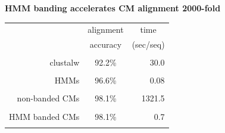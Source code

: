 \documentclass[landscape]{slides}
\begin{document}
\begin{slide}
\begin{center}

\textbf{HMM banding accelerates CM alignment 2000-fold}
\end{center}
\medskip
\medskip
\begin{center}

\begin{tabular}{rcr} 
& \multicolumn{1}{c}{alignment} & \multicolumn{1}{c}{time} \\
& \multicolumn{1}{c}{accuracy} & \multicolumn{1}{c}{(sec/seq)} \\ \hline
& \multicolumn{1}{c}{} & \multicolumn{1}{c}{} \\
clustalw & 92.2\% & 30.0 \\ 
& \multicolumn{1}{c}{} & \multicolumn{1}{c}{} \\
HMMs & 96.6\% & 0.08 \\ 
& \multicolumn{1}{c}{} & \multicolumn{1}{c}{} \\
non-banded CMs & 98.1\% & 1321.5 \\ 
& \multicolumn{1}{c}{} & \multicolumn{1}{c}{} \\
HMM banded CMs & 98.1\% & 0.7 \\ %
& \multicolumn{1}{c}{} & \multicolumn{1}{c}{} \\
\end{tabular}
\end{center}

\vfill
\end{slide}
\end{document}
